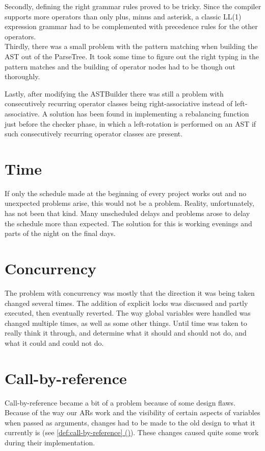 \documentclass[twoside]{report}
\newcommand*{\fullref}[1]{\hyperref[{#1}]{\ref*{#1} (\nameref*{#1})}}
\begin{document}
Secondly, defining the right grammar rules proved to be tricky. 
Since the compiler supports more operators than only plus, minus and asterisk, a classic LL(1) expression grammar had to be complemented with precedence rules for the other operators.  \\

Thirdly, there was a small problem with the pattern matching when building the AST out of the ParseTree. It took some time to figure out the right typing in the pattern matches and the building of operator nodes had to be though out thoroughly.

Lastly, after modifying the ASTBuilder there was still a problem with consecutively recurring operator classes being right-associative instead of left-associative. A solution has been found in implementing a rebalancing function just before the checker phase, in which a left-rotation is performed on an AST if such consecutively recurring operator classes are present.

\section{Time}
If only the schedule made at the beginning of every project works out and no unexpected problems arise, this would not be a problem. Reality, unfortunately, has not been that kind. Many unscheduled delays and problems arose to delay the schedule more than expected. The solution for this is working evenings and parts of the night on the final days.

\section{Concurrency}
The problem with concurrency was mostly that the direction it was being taken changed several times. The addition of explicit locks was discussed and partly executed, then eventually reverted. The way global variables were handled was changed multiple times, as well as some other things. Until time was taken to really think it through, and determine what it should and should not do, and what it could and could not do. 

\section{Call-by-reference}
Call-by-reference became a bit of a problem because of some design flaws. Because of the way our ARs work and the visibility of certain aspects of variables when passed as arguments, changes had to be made to the old design to what it currently is (see \fullref{def:call-by-reference}). These changes caused quite some work during their implementation.
\end{document}
